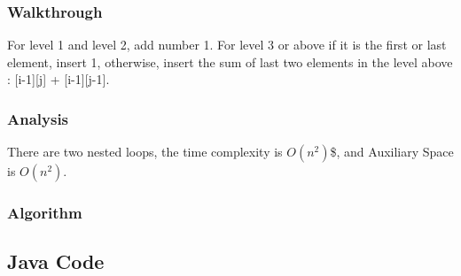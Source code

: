 \documentclass[]{book}
\begin{document}
\hypertarget{walkthrough-10}{%
\subsubsection{Walkthrough}\label{walkthrough-10}}

For level 1 and level 2, add number 1. For level 3 or above if it is the first or last element, insert 1, otherwise,
insert the sum of last two elements in the level above : {[}i-1{]}{[}j{]} + {[}i-1{]}{[}j-1{]}.

\hypertarget{analysis-11}{%
\subsubsection{Analysis}\label{analysis-11}}

There are two nested loops, the time complexity is \(O(n^2)\)\$, and Auxiliary Space is \(O(n^2)\).

\hypertarget{algorithm-11}{%
\subsubsection{Algorithm}\label{algorithm-11}}

\hypertarget{java-code-9}{%
\subsection{Java Code}\label{java-code-9}}
\end{document}
